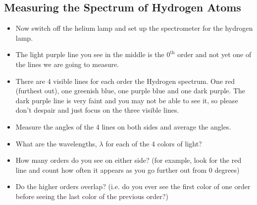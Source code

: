 \subsection{Measuring the Spectrum of Hydrogen Atoms}
\begin{itemize}
\item Now switch off the helium lamp and set up the spectrometer for the hydrogen lamp.

\item The light purple line you see in the middle is the $0^{\mathrm{th}}$ order and not yet one of the lines we are going to measure.

\item There are 4 visible lines for each order the Hydrogen spectrum. One red (furthest out), one greenish blue, one purple blue and one dark purple. The dark purple line is very faint and you may not be able to see it, so please don't despair and just focus on the three visible lines.

\item Measure the angles of the 4 lines on both sides and average the angles.

\item What are the wavelengths, $\lambda$ for each of the 4 colors of light?

\item How many orders do you see on either side? (for example, look for the red line and count how often it appears as you go further out from $0$ degrees)

\item Do the higher orders overlap? (i.e. do you ever see the first color of one order before seeing the last color of the previous order?)
\end{itemize}

